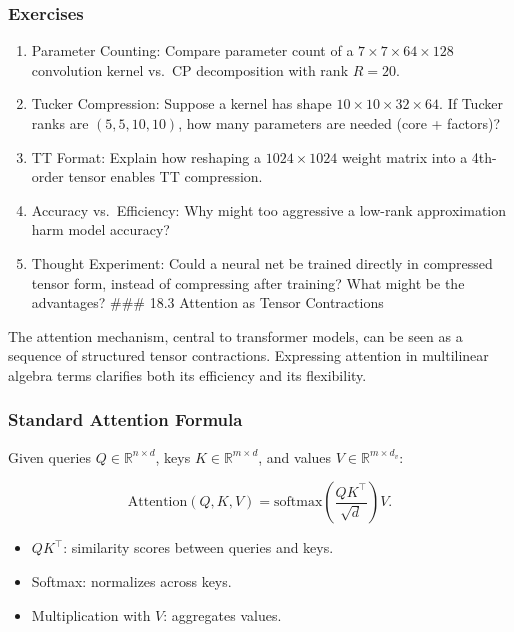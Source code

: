 \documentclass[
  letterpaper,
  DIV=11,
  numbers=noendperiod]{scrreprt}
\providecommand{\tightlist}{%
  \setlength{\itemsep}{0pt}\setlength{\parskip}{0pt}}
\begin{document}
\subsubsection{Exercises}\label{exercises-63}

\begin{enumerate}
\def\labelenumi{\arabic{enumi}.}
\item
  Parameter Counting: Compare parameter count of a
  \(7 \times 7 \times 64 \times 128\) convolution kernel vs.~CP
  decomposition with rank \(R=20\).
\item
  Tucker Compression: Suppose a kernel has shape
  \(10 \times 10 \times 32 \times 64\). If Tucker ranks are
  \((5,5,10,10)\), how many parameters are needed (core + factors)?
\item
  TT Format: Explain how reshaping a \(1024 \times 1024\) weight matrix
  into a 4th-order tensor enables TT compression.
\item
  Accuracy vs.~Efficiency: Why might too aggressive a low-rank
  approximation harm model accuracy?
\item
  Thought Experiment: Could a neural net be trained directly in
  compressed tensor form, instead of compressing after training? What
  might be the advantages? \#\#\# 18.3 Attention as Tensor Contractions
\end{enumerate}

The attention mechanism, central to transformer models, can be seen as a
sequence of structured tensor contractions. Expressing attention in
multilinear algebra terms clarifies both its efficiency and its
flexibility.

\subsubsection{Standard Attention
Formula}\label{standard-attention-formula}

Given queries \(Q \in \mathbb{R}^{n \times d}\), keys
\(K \in \mathbb{R}^{m \times d}\), and values
\(V \in \mathbb{R}^{m \times d_v}\):

\[
\text{Attention}(Q, K, V) = \text{softmax}\!\left(\frac{QK^\top}{\sqrt{d}}\right) V.
\]

\begin{itemize}
\tightlist
\item
  \(QK^\top\): similarity scores between queries and keys.
\item
  Softmax: normalizes across keys.
\item
  Multiplication with \(V\): aggregates values.
\end{itemize}
\end{document}
